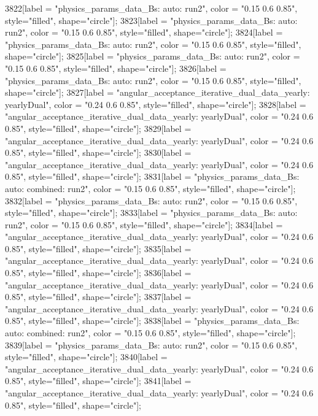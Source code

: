 {	3822[label = "physics_params_data_Bs\nfit: auto\nyear: run2", color = "0.15 0.6 0.85", style="filled", shape="circle"];
	3823[label = "physics_params_data_Bs\nfit: auto\nyear: run2", color = "0.15 0.6 0.85", style="filled", shape="circle"];
	3824[label = "physics_params_data_Bs\nfit: auto\nyear: run2", color = "0.15 0.6 0.85", style="filled", shape="circle"];
	3825[label = "physics_params_data_Bs\nfit: auto\nyear: run2", color = "0.15 0.6 0.85", style="filled", shape="circle"];
	3826[label = "physics_params_data_Bs\nfit: auto\nyear: run2", color = "0.15 0.6 0.85", style="filled", shape="circle"];
	3827[label = "angular_acceptance_iterative_dual_data_yearly\nangacc: yearlyDual", color = "0.24 0.6 0.85", style="filled", shape="circle"];
	3828[label = "angular_acceptance_iterative_dual_data_yearly\nangacc: yearlyDual", color = "0.24 0.6 0.85", style="filled", shape="circle"];
	3829[label = "angular_acceptance_iterative_dual_data_yearly\nangacc: yearlyDual", color = "0.24 0.6 0.85", style="filled", shape="circle"];
	3830[label = "angular_acceptance_iterative_dual_data_yearly\nangacc: yearlyDual", color = "0.24 0.6 0.85", style="filled", shape="circle"];
	3831[label = "physics_params_data_Bs\nfit: auto\ntrigger: combined\nyear: run2", color = "0.15 0.6 0.85", style="filled", shape="circle"];
	3832[label = "physics_params_data_Bs\nfit: auto\nyear: run2", color = "0.15 0.6 0.85", style="filled", shape="circle"];
	3833[label = "physics_params_data_Bs\nfit: auto\nyear: run2", color = "0.15 0.6 0.85", style="filled", shape="circle"];
	3834[label = "angular_acceptance_iterative_dual_data_yearly\nangacc: yearlyDual", color = "0.24 0.6 0.85", style="filled", shape="circle"];
	3835[label = "angular_acceptance_iterative_dual_data_yearly\nangacc: yearlyDual", color = "0.24 0.6 0.85", style="filled", shape="circle"];
	3836[label = "angular_acceptance_iterative_dual_data_yearly\nangacc: yearlyDual", color = "0.24 0.6 0.85", style="filled", shape="circle"];
	3837[label = "angular_acceptance_iterative_dual_data_yearly\nangacc: yearlyDual", color = "0.24 0.6 0.85", style="filled", shape="circle"];
	3838[label = "physics_params_data_Bs\nfit: auto\ntrigger: combined\nyear: run2", color = "0.15 0.6 0.85", style="filled", shape="circle"];
	3839[label = "physics_params_data_Bs\nfit: auto\nyear: run2", color = "0.15 0.6 0.85", style="filled", shape="circle"];
	3840[label = "angular_acceptance_iterative_dual_data_yearly\nangacc: yearlyDual", color = "0.24 0.6 0.85", style="filled", shape="circle"];
	3841[label = "angular_acceptance_iterative_dual_data_yearly\nangacc: yearlyDual", color = "0.24 0.6 0.85", style="filled", shape="circle"];
}
